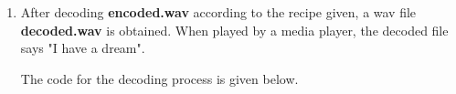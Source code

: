 \documentclass[10pt,a4paper, margin=1in]{article}
\begin{document}
\begin{enumerate}
\item After decoding \textbf{encoded.wav} according to the recipe given, a wav file \textbf{decoded.wav} is obtained.
When played by a media player, the decoded file says "I have a dream".

The code for the decoding process is given below.
\inputminted{python}{hw4.py}


\end{enumerate}
\end{document}
